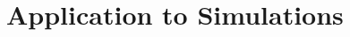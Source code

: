 \documentclass{stdlocal}
\begin{document}
\section{Application to Simulations} %
\label{sec:application_to_simulations}

\end{document}
